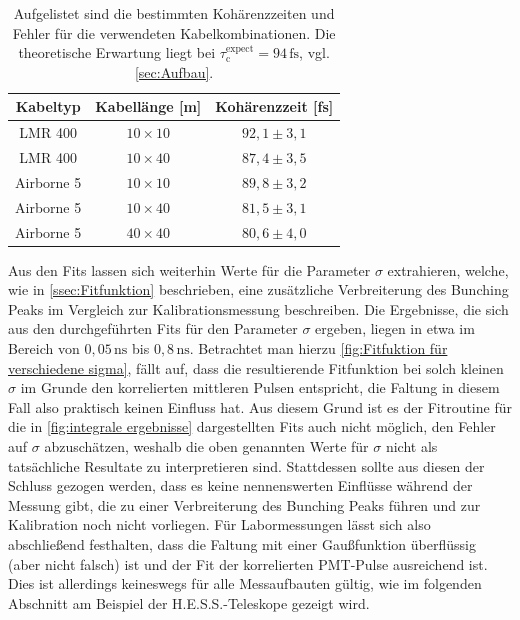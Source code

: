\begin{table}[h]
    \centering
    \begin{tabular}{|c|c|c|} \hline
        Kabeltyp    & Kabellänge [m] & Kohärenzzeit [fs]  \\\hline
        LMR 400     & $10\times 10$  & $92{,}1 \pm 3{,}1$ \\\hline
        LMR 400     & $10\times 40$  & $87{,}4 \pm 3{,}5$ \\\hline
        Airborne 5  & $10\times 10$  & $89{,}8 \pm 3{,}2$ \\\hline
        Airborne 5  & $10\times 40$  & $81{,}5 \pm 3{,}1$ \\\hline
        Airborne 5  & $40\times 40$  & $80{,}6 \pm 4{,}0$ \\\hline
    \end{tabular}
    \caption{Aufgelistet sind die bestimmten Kohärenzzeiten und Fehler für die verwendeten Kabelkombinationen. Die theoretische Erwartung liegt bei $\tau_{\mathrm{c}}^{\mathrm{expect}}=94\,\mathrm{fs}$, vgl. \autoref{sec:Aufbau}.}
    \label{tab:gemessene Kohärenzzeiten}
\end{table}
Aus den Fits lassen sich weiterhin Werte für die Parameter $\sigma$ extrahieren, welche, wie in \autoref{ssec:Fitfunktion} beschrieben, eine zusätzliche Verbreiterung des Bunching Peaks im Vergleich zur Kalibrationsmessung beschreiben. 
Die Ergebnisse, die sich aus den durchgeführten Fits für den Parameter $\sigma$ ergeben, liegen in etwa im Bereich von $0{,}05\,\mathrm{ns}$ bis $0{,}8\,\mathrm{ns}$. 
Betrachtet man hierzu \autoref{fig:Fitfuktion für verschiedene sigma}, fällt auf, dass die resultierende Fitfunktion bei solch kleinen $\sigma$ im Grunde den korrelierten mittleren Pulsen entspricht, die Faltung in diesem Fall also praktisch keinen Einfluss hat. 
Aus diesem Grund ist es der Fitroutine für die in \autoref{fig:integrale ergebnisse} dargestellten Fits auch nicht möglich, den Fehler auf $\sigma$ abzuschätzen, weshalb die oben genannten Werte für $\sigma$ nicht als tatsächliche Resultate zu interpretieren sind. 
Stattdessen sollte aus diesen der Schluss gezogen werden, dass es keine nennenswerten Einflüsse während der Messung gibt, die zu einer Verbreiterung des Bunching Peaks führen und zur Kalibration noch nicht vorliegen. 
Für Labormessungen lässt sich also abschließend festhalten, dass die Faltung mit einer Gaußfunktion überflüssig (aber nicht falsch) ist und der Fit der korrelierten PMT-Pulse ausreichend ist. 
Dies ist allerdings keineswegs für alle Messaufbauten gültig, wie im folgenden Abschnitt am Beispiel der H.E.S.S.-Teleskope gezeigt wird.

